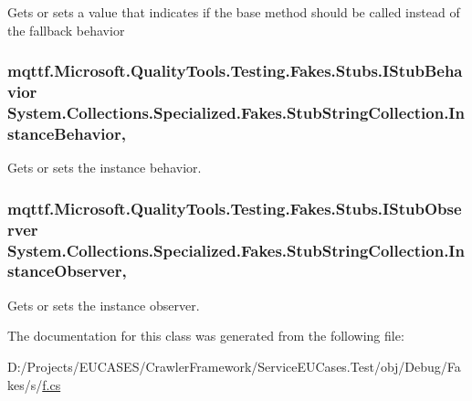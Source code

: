 Gets or sets a value that indicates if the base method should be called instead of the fallback behavior

\hypertarget{class_system_1_1_collections_1_1_specialized_1_1_fakes_1_1_stub_string_collection_a53693d415c52c2dac9a27048a05f3b78}{
\subsubsection[{Instance\-Behavior}]{\setlength{\rightskip}{0pt plus 5cm}mqttf.\-Microsoft.\-Quality\-Tools.\-Testing.\-Fakes.\-Stubs.\-I\-Stub\-Behavior System.\-Collections.\-Specialized.\-Fakes.\-Stub\-String\-Collection.\-Instance\-Behavior\hspace{0.3cm}{\ttfamily [get]}, {\ttfamily [set]}}}\label{class_system_1_1_collections_1_1_specialized_1_1_fakes_1_1_stub_string_collection_a53693d415c52c2dac9a27048a05f3b78}


Gets or sets the instance behavior.

\hypertarget{class_system_1_1_collections_1_1_specialized_1_1_fakes_1_1_stub_string_collection_a62be5ad7a094495dc623c986e4231302}{
\subsubsection[{Instance\-Observer}]{\setlength{\rightskip}{0pt plus 5cm}mqttf.\-Microsoft.\-Quality\-Tools.\-Testing.\-Fakes.\-Stubs.\-I\-Stub\-Observer System.\-Collections.\-Specialized.\-Fakes.\-Stub\-String\-Collection.\-Instance\-Observer\hspace{0.3cm}{\ttfamily [get]}, {\ttfamily [set]}}}\label{class_system_1_1_collections_1_1_specialized_1_1_fakes_1_1_stub_string_collection_a62be5ad7a094495dc623c986e4231302}


Gets or sets the instance observer.



The documentation for this class was generated from the following file\-:\begin{DoxyCompactItemize}
\item 
D\-:/\-Projects/\-E\-U\-C\-A\-S\-E\-S/\-Crawler\-Framework/\-Service\-E\-U\-Cases.\-Test/obj/\-Debug/\-Fakes/s/\hyperlink{s_2f_8cs}{f.\-cs}\end{DoxyCompactItemize}

